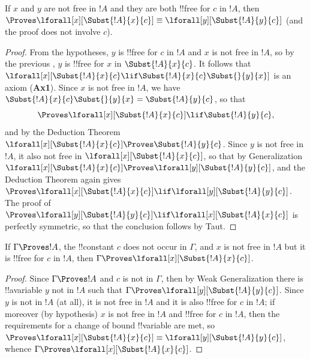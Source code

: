 \documentclass[../../../include/open-logic-section]{subfiles}
\begin{document}
\begin{lem}
If $x$ and $y$ are not free in $!A$ and they are both !!{free for} $c$
in $!A$, then $\Proves \lforall[x][\Subst{!A}{x}{c}] \equiv
\lforall[y][\Subst{!A}{y}{c}]$ (and the proof does not involve $c$).
\end{lem}

\begin{proof} 
From the hypotheses, $y$ is !!{free for} $c$ in $!A$ and $x$ is not
free in $!A$, so by the previous , $y$ is
!!{free for} $x$ in $\Subst{!A}{x}{c}$. It follows that
$\lforall[x][\Subst{!A}{x}{c} \lif \Subst{!A}{x}{c} \Subst{}{y}{x}]$
is an axiom (\textbf{Ax1}). Since $x$ is not free in $!A$, we have
$\Subst{!A}{x}{c} \Subst{}{y}{x} = \Subst{!A}{y}{c}$, so that 
\[
\Proves \lforall[x][\Subst{!A}{x}{c}] \lif \Subst{!A}{y}{c}, 
\] 
and by the Deduction Theorem $\lforall[x][\Subst{!A}{x}{c}] \Proves
\Subst{!A}{y}{c}$. Since $y$ is not free in $!A$, it also not free in
$\lforall[x][\Subst{!A}{x}{c}]$, so that by Generalization
$\lforall[x][\Subst{!A}{x}{c}] \Proves \lforall[y][\Subst{!A}{y}{c}]$,
and the Deduction Theorem again gives $\Proves
\lforall[x][\Subst{!A}{x}{c}] \lif \lforall[y][\Subst{!A}{y}{c}]$.
The proof of $\Proves \lforall[y][\Subst{!A}{y}{c}] \lif \lforall[x]
[\Subst{!A}{x}{c}]$ is perfectly symmetric, so that the conclusion
follows by Taut.
\end{proof}

\begin{thm}
If $\Gamma \Proves !A$, the !!{constant} $c$ does not occur in
$\Gamma$, and $x$ is not free in $!A$ but it is !!{free for} $c$ in $!A$,
then $\Gamma \Proves \lforall[x][\Subst{!A}{x}{c}]$. 
\end{thm}

\begin{proof} 
Since $\Gamma \Proves !A$ and $c$ is not in $\Gamma$, then by
Weak Generalization there is !!a{variable} $y$ not in $!A$ such that
$\Gamma \Proves \lforall[y][\Subst{!A}{y}{c}]$. Since $y$ is not in $!A$
(at all), it is not free in $!A$ and it is also !!{free for} $c$ in $!A$;
if moreover (by hypothesis) $x$ is not free in $!A$ and !!{free for} $c$ in
$!A$, then the requirements for a change of bound !!{variable} are met, so
$\Proves \lforall[x][\Subst{!A}{x}{c}] \equiv
\lforall[y][\Subst{!A}{y}{c}]$, whence $\Gamma \Proves
\lforall[x][\Subst{!A}{x}{c}]$. 
\end{proof}
\end{document}

